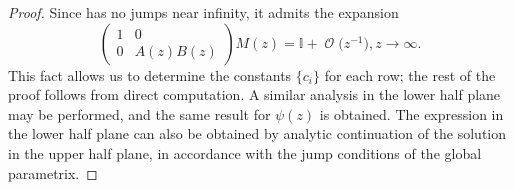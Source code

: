 \documentclass[10pt,a4paper]{amsart}
\DeclareMathOperator{\OO}{\mathcal{O}}
\numberwithin{equation}{section}
\begin{document}
\begin{proof}
Since  has no jumps near infinity, it admits the expansion
 \begin{equation*}
 \begin{pmatrix}
 1 & 0\\
 0 & A(z)B(z)
 \end{pmatrix} M(z) = \mathbb{I} + \OO\bigl(z^{-1}\bigr), z\to \infty.
 \end{equation*}
This fact allows us to determine the constants $\{c_i\}$ for each row; the rest of the proof follows from direct computation. A similar analysis in the lower half plane may be performed, and the same result for $\psi(z)$ is obtained. The expression in the lower half plane can also be obtained by analytic continuation of the solution in the upper half plane, in accordance with the jump conditions of the global parametrix.
\end{proof}
\end{document}
